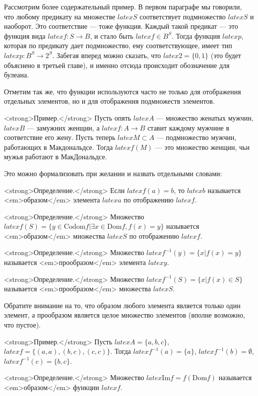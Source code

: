 Рассмотрим более содержательный пример. В первом параграфе мы говорили, что любому предикату на множестве $latex S$ соответствует подмножество $latex S$ и наоборот. Это соответствие — тоже функция. Каждый такой предикат — это функция вида $latex f:S\to B$, и стало быть $latex f\in B^S$. Тогда функция $latex p$, которая по предикату дает подмножество, ему соответствующее, имеет тип $latex p:B^S \to 2^S$. Забегая вперед можно сказать, что $latex 2=\{0, 1\}$ (это будет объяснено в третьей главе), и именно отсюда происходит обозначение для булеана.

Отметим так же, что функции используются часто не только для отображения отдельных элементов, но и для отображения подмножеств элементов.

<strong>Пример.</strong> Пусть опять $latex A$ — множество женатых мужчин, $latex B$ — замужних женщин, а $latex f: A\to B$ ставит каждому мужчине в соответствие его жену. Пусть теперь $latex M\subset A$ — подмножество мужчин, работающих в Макдональдсе. Тогда $latex f(M)$ — это множество женщин, чьи мужья работают в МакДональдсе.

Это можно формализовать при желании и назвать отдельными словами:

<strong>Определение.</strong> Если $latex f(a) = b$, то $latex b$ называется <em>образом</em> элемента $latex a$ по отображению $latex f$.

<strong>Определение.</strong> Множество $latex f(S) = \{y\in \mathrm{Codom}f|\exists x \in \mathrm{Dom}f, f(x) = y \}$ называется <em>образом</em> множества $latex S$ по отображению $latex f$.

<strong>Определение.</strong> Множество $latex f^{-1}(y) = \{x | f(x) = y \}$ называется <em>прообразом</em> элемента $latex y$.

<strong>Определение.</strong> Множество $latex f^{-1}(S) = \{x | f(x) \in S \}$ называется <em>прообразом</em> множества $latex S$.

Обратите внимание на то, что образом любого элемента является только один элемент, а прообразом является целое множество элементов (вполне возможно, что пустое).

<strong>Пример.</strong> Пусть $latex A = \{a, b, c\}$, $latex f = \{(a, a), (b, c), (c, c)\}$. Тогда $latex f^{-1}(a) = \{a\}$, $latex f^{-1}(b) = \emptyset$, $latex f^{-1}(c) = \{b, c\}$.

<strong>Определение.</strong> Множество $latex \mathrm{Im} f = f(\mathrm{Dom} f)$ называется <em>образом</em> функции $latex f$.

